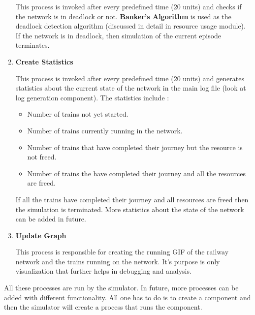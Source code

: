 \begin{enumerate}
This process is invoked after every predefined time (20 units) and checks if the network is in deadlock 
or not.\textbf{ Banker's Algorithm} is used as the deadlock detection algorithm (discussed in detail in 
resource usage module). If the network is in deadlock, then 
simulation of the current episode terminates.

\item \textbf{Create Statistics}

This process is invoked after every predefined time (20 units) and generates statistics about the current 
state of the network in the main log file (look at log generation component). The statistics include :
\begin{itemize}
\item Number of trains not yet started. 
\item Number of trains currently running in the network.
\item Number of trains that have completed their journey but the resource is not freed.
\item Number of trains the have completed their journey and all the resources are freed.    
\end{itemize}
If all the trains have completed their journey and all resources are freed then the simulation is terminated.
More statistics about the state of the network can be added in future.  

\item \textbf{Update Graph}

This process is responsible for creating the running GIF of the railway network and the trains running on
the network. It's purpose is only visualization that further helps in debugging and analysis.
\end{enumerate}

All these processes are run by the simulator. In future, more processes can be added with different 
functionality. All one has to do is to create a component and then the simulator will create a process
that runs the component.



